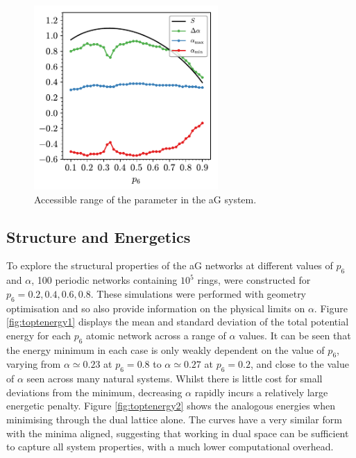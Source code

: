 \begin{figure}[bt]
	\centering
	\includegraphics[width=7cm]{./figures/targeted_opt/topt_alpha_limits.pdf}
	\caption{Accessible range of the \aw{} parameter in the aG system.%
	}
	\label{fig:alphalim}
\end{figure}


\subsection{Structure and Energetics}

To explore the structural properties of the aG networks at different values of $p_6$ and $\alpha$, 100 periodic networks containing $10^5$ rings, were constructed for $p_6=0.2,0.4,0.6,0.8$. 
These simulations were performed with geometry optimisation and so also provide information on the physical limits on $\alpha$.
Figure \ref{fig:toptenergy1} displays the mean and standard deviation of the total potential energy for each $p_6$ atomic network across a range of $\alpha$ values. 
It can be seen that the energy minimum in each case is only weakly dependent on the value of $p_6$, varying from $\alpha\simeq{0.23}$ at $p_6=0.8$ to $\alpha\simeq{0.27}$ at $p_6=0.2$, and close to the value of $\alpha$ seen across many natural systems. 
Whilst there is little cost for small deviations from the minimum, decreasing $\alpha$ rapidly incurs a relatively large energetic penalty. 
Figure \ref{fig:toptenergy2} shows the analogous energies when minimising through the dual lattice alone. 
The curves have a very similar form with the minima aligned, suggesting that working in dual space can be sufficient to capture all system properties, with a much lower computational overhead.


